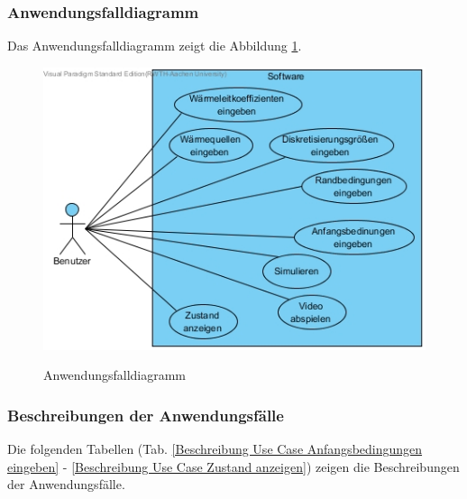 \subsubsection{Anwendungsfalldiagramm}
Das Anwendungsfalldiagramm zeigt die Abbildung \ref{Use Case Diagramm}.
\begin{figure}[H]
	\centering
	\includegraphics[scale=.79]{Bilder/Use_Case_Diagramm.jpg}\\
	\caption{Anwendungsfalldiagramm}
	\label{Use Case Diagramm}
\end{figure}

\subsubsection{Beschreibungen der Anwendungsfälle}
Die folgenden Tabellen (Tab. \ref{Beschreibung Use Case Anfangsbedingungen eingeben} - \ref{Beschreibung Use Case Zustand anzeigen}) zeigen die Beschreibungen der Anwendungsfälle.

